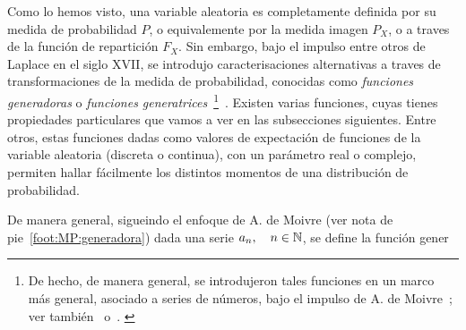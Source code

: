 \label{s:MP:generatrices}

Como lo  hemos visto,  una variable aleatoria  es completamente definida  por su
medida de  probabilidad $P$,  o equivalemente  por la medida  imagen $P_X$,  o a
traves  de la funci\'on  de repartici\'on  $F_X$. Sin  embargo, bajo  el impulso
entre  otros  de  Laplace  en  el siglo  XVII,  se  introdujo  caracterisaciones
alternativas  a  traves  de  transformaciones  de  la  medida  de  probabilidad,
conocidas    como    {\em    funciones    generadoras}    o    {\em    funciones
  generatrices}~\footnote{De  hecho, de  manera general,  se  introdujeron tales
  funciones en un  marco m\'as general, asociado a series  de n\'umeros, bajo el
  impulso de A. de Moivre~\cite{Dem30}; ver tambi\'en~\cite{Sti30, Eul41, Eul50,
    Dem56}
  o~\cite[Sec.~1.2.9]{Knu97_v1}.        \label{Foot:MP:Generadora}}~\cite{Lap20}.
Existen varias funciones, cuyas tienes  propiedades particulares que vamos a ver
en las subsecciones siguientes. Entre  otros, estas funciones dadas como valores
de expectaci\'on  de funciones de  la variable aleatoria (discreta  o continua),
con un par\'ametro  real o complejo, permiten hallar  f\'acilmente los distintos
momentos de una distribuci\'on de probabilidad.



De manera general, sigueindo el enfoque de A. de Moivre (ver nota de pie~\ref{foot:MP:generadora}) dada una serie $a_n, \quad n \in \mathbb{N}$, se define la funci\'on gener



